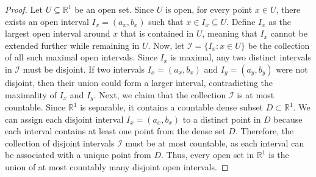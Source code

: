 \documentclass[12pt]{article}
\begin{document}
\begin{exercise}{29}
        \begin{proof} 
            Let \( U \subseteq \mathbb{R}^1 \) be an open set. Since \( U \) is open, for every point \( x \in U \), there exists an open interval \( I_x = (a_x, b_x) \) such that \( x \in I_x \subseteq U \). Define \( I_x \) as the largest open interval around \( x \) that is contained in \( U \), meaning that \( I_x \) cannot be extended further while remaining in \( U \). Now, let \( \mathcal{I} = \{ I_x : x \in U \} \) be the collection of all such maximal open intervals. Since \( I_x \) is maximal, any two distinct intervals in \( \mathcal{I} \) must be disjoint. If two intervals \( I_x = (a_x, b_x) \) and \( I_y = (a_y, b_y) \) were not disjoint, then their union could form a larger interval, contradicting the maximality of \( I_x \) and \( I_y \). Next, we claim that the collection \( \mathcal{I} \) is at most countable. Since \( \mathbb{R}^1 \) is separable, it contains a countable dense subset \( D \subset \mathbb{R}^1 \). We can assign each disjoint interval \( I_x = (a_x, b_x) \) to a distinct point in \( D \) because each interval contains at least one point from the dense set \( D \). Therefore, the collection of disjoint intervals \( \mathcal{I} \) must be at most countable, as each interval can be associated with a unique point from \( D \). Thus, every open set in \( \mathbb{R}^1 \) is the union of at most countably many disjoint open intervals. 
        \end{proof}
\end{exercise}
\end{document}
